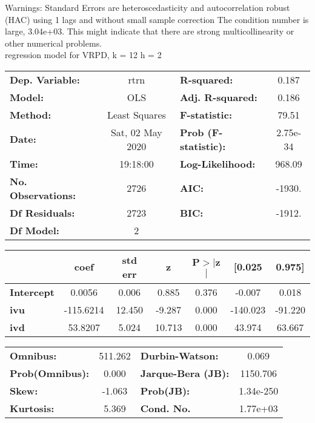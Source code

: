 Warnings: \newline
 [1] Standard Errors are heteroscedasticity and autocorrelation robust (HAC) using 1 lags and without small sample correction \newline
 [2] The condition number is large, 3.04e+03. This might indicate that there are \newline
 strong multicollinearity or other numerical problems.\\ 

regression model for VRPD, k = 12 h = 2\begin{center}
\begin{tabular}{lclc}
\toprule
\textbf{Dep. Variable:}    &       rtrn       & \textbf{  R-squared:         } &     0.187   \\
\textbf{Model:}            &       OLS        & \textbf{  Adj. R-squared:    } &     0.186   \\
\textbf{Method:}           &  Least Squares   & \textbf{  F-statistic:       } &     79.51   \\
\textbf{Date:}             & Sat, 02 May 2020 & \textbf{  Prob (F-statistic):} &  2.75e-34   \\
\textbf{Time:}             &     19:18:00     & \textbf{  Log-Likelihood:    } &    968.09   \\
\textbf{No. Observations:} &        2726      & \textbf{  AIC:               } &    -1930.   \\
\textbf{Df Residuals:}     &        2723      & \textbf{  BIC:               } &    -1912.   \\
\textbf{Df Model:}         &           2      & \textbf{                     } &             \\
\bottomrule
\end{tabular}
\begin{tabular}{lcccccc}
                   & \textbf{coef} & \textbf{std err} & \textbf{z} & \textbf{P$> |$z$|$} & \textbf{[0.025} & \textbf{0.975]}  \\
\midrule
\textbf{Intercept} &       0.0056  &        0.006     &     0.885  &         0.376        &       -0.007    &        0.018     \\
\textbf{ivu}       &    -115.6214  &       12.450     &    -9.287  &         0.000        &     -140.023    &      -91.220     \\
\textbf{ivd}       &      53.8207  &        5.024     &    10.713  &         0.000        &       43.974    &       63.667     \\
\bottomrule
\end{tabular}
\begin{tabular}{lclc}
\textbf{Omnibus:}       & 511.262 & \textbf{  Durbin-Watson:     } &     0.069  \\
\textbf{Prob(Omnibus):} &   0.000 & \textbf{  Jarque-Bera (JB):  } &  1150.706  \\
\textbf{Skew:}          &  -1.063 & \textbf{  Prob(JB):          } & 1.34e-250  \\
\textbf{Kurtosis:}      &   5.369 & \textbf{  Cond. No.          } &  1.77e+03  \\
\bottomrule
\end{tabular}
\end{center}


